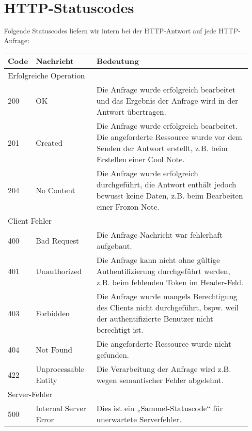 \documentclass[a4paper]{scrreprt}
\begin{document}
	\section{HTTP-Statuscodes}
	Folgende Statuscodes liefern wir intern bei der HTTP-Antwort auf jede HTTP-Anfrage:
	\begin{flushleft}
		\begin{tabular}{|p{}|p{}|p{}|}
		\hline
		\textbf{Code} & \textbf{Nachricht} & \textbf{Bedeutung} \\
		\hline
		\multicolumn{3}{|l|}{Erfolgreiche Operation} \\
		\hline
		200 & OK & Die Anfrage wurde erfolgreich bearbeitet und das Ergebnis der Anfrage wird in der Antwort übertragen. \\
		201 & Created & Die Anfrage wurde erfolgreich bearbeitet. Die angeforderte Ressource wurde vor dem Senden der Antwort erstellt, z.B. beim Erstellen einer Cool Note. \\
		204 & No Content & Die Anfrage wurde erfolgreich durchgeführt, die Antwort enthält jedoch bewusst keine Daten, z.B. beim Bearbeiten einer Frozon Note. \\
		\hline
		\multicolumn{3}{|l|}{Client-Fehler} \\
		\hline
		400 & Bad Request & Die Anfrage-Nachricht war fehlerhaft aufgebaut. \\
		401 & Unauthorized & Die Anfrage kann nicht ohne gültige Authentifizierung durchgeführt werden, z.B. beim fehlenden Token im Header-Feld. \\
		403 & Forbidden & Die Anfrage wurde mangels Berechtigung des Clients nicht durchgeführt, bspw. weil der authentifizierte Benutzer nicht berechtigt ist. \\
		404 & Not Found & Die angeforderte Ressource wurde nicht gefunden. \\
		422 & Unprocessable Entity & Die Verarbeitung der Anfrage wird z.B. wegen semantischer Fehler abgelehnt. \\
		\hline
		\multicolumn{3}{|l|}{Server-Fehler} \\
		\hline
		500 & Internal Server Error & Dies ist ein „Sammel-Statuscode“ für unerwartete Serverfehler. \\
		\hline	
		\end{tabular}
	\end{flushleft}
\end{document}
